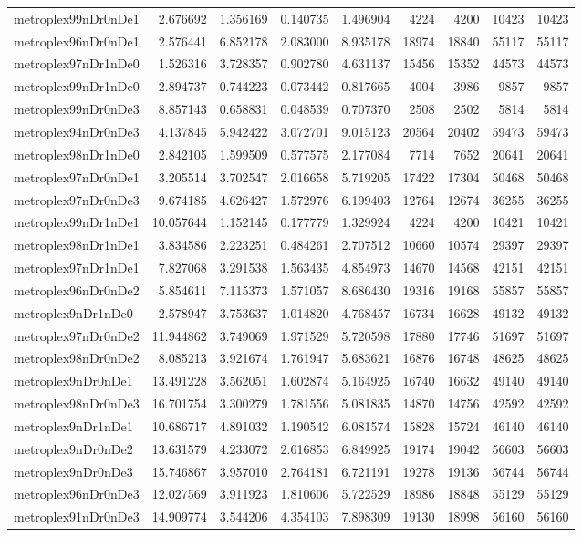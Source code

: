 \begin{longtable}{|l|r|r|r|r|r|r|r|r|}
metroplex99nDr0nDe1 & 2.676692 & 1.356169 & 0.140735 & 1.496904 & 4224 & 4200 & 10423 & 10423 \\
metroplex96nDr0nDe1 & 2.576441 & 6.852178 & 2.083000 & 8.935178 & 18974 & 18840 & 55117 & 55117 \\
metroplex97nDr1nDe0 & 1.526316 & 3.728357 & 0.902780 & 4.631137 & 15456 & 15352 & 44573 & 44573 \\
metroplex99nDr1nDe0 & 2.894737 & 0.744223 & 0.073442 & 0.817665 & 4004 & 3986 & 9857 & 9857 \\
metroplex99nDr0nDe3 & 8.857143 & 0.658831 & 0.048539 & 0.707370 & 2508 & 2502 & 5814 & 5814 \\
metroplex94nDr0nDe3 & 4.137845 & 5.942422 & 3.072701 & 9.015123 & 20564 & 20402 & 59473 & 59473 \\
metroplex98nDr1nDe0 & 2.842105 & 1.599509 & 0.577575 & 2.177084 & 7714 & 7652 & 20641 & 20641 \\
metroplex97nDr0nDe1 & 3.205514 & 3.702547 & 2.016658 & 5.719205 & 17422 & 17304 & 50468 & 50468 \\
metroplex97nDr0nDe3 & 9.674185 & 4.626427 & 1.572976 & 6.199403 & 12764 & 12674 & 36255 & 36255 \\
metroplex99nDr1nDe1 & 10.057644 & 1.152145 & 0.177779 & 1.329924 & 4224 & 4200 & 10421 & 10421 \\
metroplex98nDr1nDe1 & 3.834586 & 2.223251 & 0.484261 & 2.707512 & 10660 & 10574 & 29397 & 29397 \\
metroplex97nDr1nDe1 & 7.827068 & 3.291538 & 1.563435 & 4.854973 & 14670 & 14568 & 42151 & 42151 \\
metroplex96nDr0nDe2 & 5.854611 & 7.115373 & 1.571057 & 8.686430 & 19316 & 19168 & 55857 & 55857 \\
metroplex9nDr1nDe0 & 2.578947 & 3.753637 & 1.014820 & 4.768457 & 16734 & 16628 & 49132 & 49132 \\
metroplex97nDr0nDe2 & 11.944862 & 3.749069 & 1.971529 & 5.720598 & 17880 & 17746 & 51697 & 51697 \\
metroplex98nDr0nDe2 & 8.085213 & 3.921674 & 1.761947 & 5.683621 & 16876 & 16748 & 48625 & 48625 \\
metroplex9nDr0nDe1 & 13.491228 & 3.562051 & 1.602874 & 5.164925 & 16740 & 16632 & 49140 & 49140 \\
metroplex98nDr0nDe3 & 16.701754 & 3.300279 & 1.781556 & 5.081835 & 14870 & 14756 & 42592 & 42592 \\
metroplex9nDr1nDe1 & 10.686717 & 4.891032 & 1.190542 & 6.081574 & 15828 & 15724 & 46140 & 46140 \\
metroplex9nDr0nDe2 & 13.631579 & 4.233072 & 2.616853 & 6.849925 & 19174 & 19042 & 56603 & 56603 \\
metroplex9nDr0nDe3 & 15.746867 & 3.957010 & 2.764181 & 6.721191 & 19278 & 19136 & 56744 & 56744 \\
metroplex96nDr0nDe3 & 12.027569 & 3.911923 & 1.810606 & 5.722529 & 18986 & 18848 & 55129 & 55129 \\
metroplex91nDr0nDe3 & 14.909774 & 3.544206 & 4.354103 & 7.898309 & 19130 & 18998 & 56160 & 56160 \\
\end{longtable}
